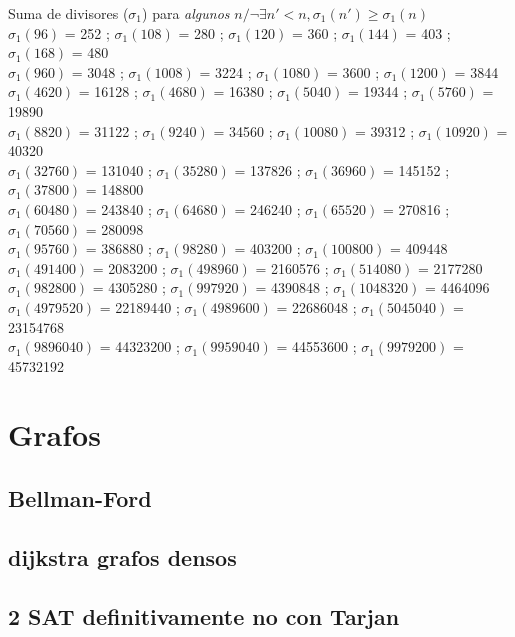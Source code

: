 %
Suma de divisores ($\sigma_1$) para \emph{algunos} $n / \neg\exists n'<n, \sigma_1(n') \geqslant \sigma_1(n)$ \\
$\sigma_1(96)$ = 252 ; $\sigma_1(108)$ = 280 ; $\sigma_1(120)$ = 360 ; $\sigma_1(144)$ = 403 ; $\sigma_1(168)$ = 480 \\
$\sigma_1(960)$ = 3048 ; $\sigma_1(1008)$ = 3224 ; $\sigma_1(1080)$ = 3600 ; $\sigma_1(1200)$ = 3844 \\
$\sigma_1(4620)$ = 16128 ; $\sigma_1(4680)$ = 16380 ; $\sigma_1(5040)$ = 19344 ; $\sigma_1(5760)$ = 19890 \\
$\sigma_1(8820)$ = 31122 ; $\sigma_1(9240)$ = 34560 ; $\sigma_1(10080)$ = 39312 ; $\sigma_1(10920)$ = 40320 \\
$\sigma_1(32760)$ = 131040 ; $\sigma_1(35280)$ = 137826 ; $\sigma_1(36960)$ = 145152 ; $\sigma_1(37800)$ = 148800 \\
$\sigma_1(60480)$ = 243840 ; $\sigma_1(64680)$ = 246240 ; $\sigma_1(65520)$ = 270816 ; $\sigma_1(70560)$ = 280098 \\
$\sigma_1(95760)$ = 386880 ; $\sigma_1(98280)$ = 403200 ; $\sigma_1(100800)$ = 409448  \\
$\sigma_1(491400)$ = 2083200 ; $\sigma_1(498960)$ = 2160576 ; $\sigma_1(514080)$ = 2177280 \\
$\sigma_1(982800)$ = 4305280 ; $\sigma_1(997920)$ = 4390848 ; $\sigma_1(1048320)$ = 4464096 \\
$\sigma_1(4979520)$ = 22189440 ; $\sigma_1(4989600)$ = 22686048 ; $\sigma_1(5045040)$ = 23154768 \\
$\sigma_1(9896040)$ = 44323200 ; $\sigma_1(9959040)$ = 44553600 ; $\sigma_1(9979200)$ = 45732192
%
%


\section{Grafos}%
\subsection{Bellman-Ford}
\subsection{dijkstra grafos densos}
\subsection{2 SAT definitivamente no con Tarjan}
